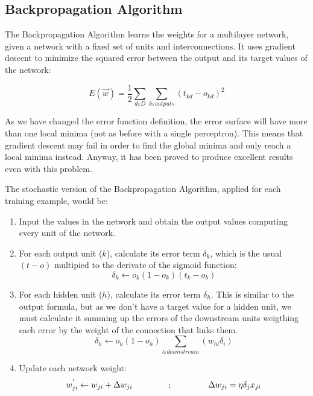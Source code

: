 	\subsection{Backpropagation Algorithm}
	The Backpropagation Algorithm learns the weights for a multilayer  network, given a network with a fixed set of units and interconnections. It uses gradient descent to minimize the squared error between the output and its target values of the network:

		\begin{equation}
			\label{squared_error_function_network}
			E(\vec{w}) = \frac{1}{2} \sum_{d \varepsilon D} \sum_{k \varepsilon outputs} (t_{kd}-o_{kd})^2 
		\end{equation}

	As we have changed the error function definition, the error surface will have more than one local minima (not as before with a single perceptron). This means that gradient descent may fail in order to find the global minima and only reach a local minima instead. Anyway, it has been proved to produce excellent results even with this problem.

	The stochastic version of the Backpropagation Algorithm, applied for each training example, would be:

		\begin{enumerate}

			\item Input the values in the network and obtain the output values computing every unit of the network.
			\item For each output unit ($k$), calculate its error term $\delta_k$, which is the usual $(t-o)$ multipied to the derivate of the sigmoid function:
				\begin{equation}
					\label{backpropagation_output_error}
					\delta_k \leftarrow o_k (1 - o_k)(t_k - o_k)
				\end{equation}				

			\item For each hidden unit ($h$), calculate its error term $\delta_h$. This is similar to the output formula, but as we don't have a target value for a hidden unit, we must calculate it summing up the errors of the downstream units weigthing each error by the weight of the connection that links them. 
				\begin{equation}
					\label{backpropagation_hidden_error}
					\delta_h \leftarrow o_h (1 - o_h) \sum_{l \varepsilon downstream} (w_{hl} \delta_i)
				\end{equation}

			\item Update each network weight:
				\begin{equation}
					\label{backpropagation_weight_update}
					w^{'}_{ji} \leftarrow w_{ji} + \Delta w_{ji} \hspace{1.5cm} ; \hspace{1.5cm} \Delta w_{ji} = \eta \delta_j x_{ji}
				\end{equation}

		\end{enumerate} 

